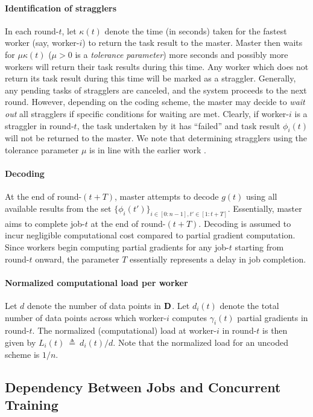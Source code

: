 \paragraph{Identification of stragglers} In each round-$t$, let $\kappa(t)$ denote the time (in seconds) taken for the fastest worker (say, worker-$i$) to return the task result to the master. Master then waits for $\mu\kappa(t)$ ($\mu>0$ is a \textit{tolerance parameter}) more seconds and possibly more workers will return their task results during this time. Any worker which does not return its task result during this time will be marked as a straggler. Generally, any pending tasks of stragglers are canceled, and the system proceeds to the next round. However, depending on the coding scheme, the master may decide to \textit{wait out} all stragglers if specific conditions for waiting are met. Clearly, if worker-$i$ is a straggler in round-$t$, the task undertaken by it has ``failed'' and task result $\phi_i(t)$ will not be returned to the master. We note that determining stragglers using the tolerance parameter $\mu$ is in line with the earlier work \cite{seqmatmult}.

\paragraph{Decoding} At the end of round-$(t+T)$, master attempts to decode $g(t)$ using all available results from the set $\{\phi_i(t')\}_{i\in[0:n-1],t'\in[1:t+T]}$. Essentially, master aims to complete job-$t$ at the end of round-$(t+T)$. Decoding is assumed to incur negligible computational cost compared to partial gradient computation. Since workers begin computing partial gradients for any job-$t$ starting from round-$t$ onward, the parameter $T$ essentially represents a delay in job completion.

\paragraph{Normalized computational load per worker} Let $d$ denote the number of data points in $\mathbf{D}$. Let $d_i(t)$ denote the total number of data points across which worker-$i$ computes $\gamma_i(t)$ partial gradients in round-$t$. The normalized (computational) load at worker-$i$ in round-$t$ is then given by $L_i(t)~\triangleq~{d_i(t)}/{d}$. Note that the normalized load for an uncoded scheme is $1/n$.


\subsection{Dependency Between Jobs and Concurrent Training}\label{ch2:sec:job_dependency}

